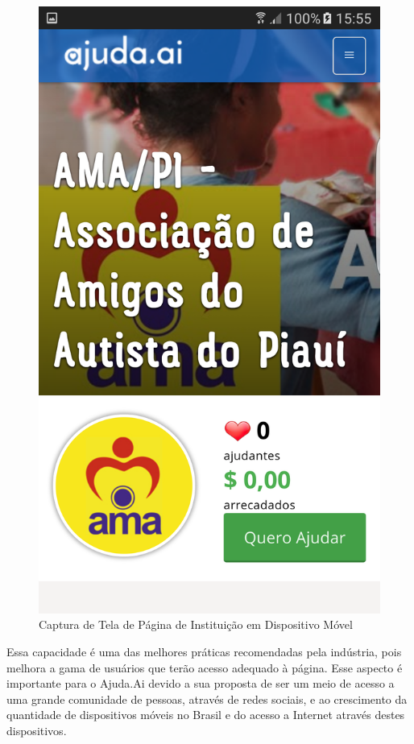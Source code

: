 \begin{figure}[H]
\begin{minipage}{0.4\textwidth}
    \centering
    \caption{Captura de Tela de Página de Instituição em Dispositivo Móvel}
    \label{fig:ss_ajudaai_06}
    \includegraphics[scale=0.12]{imagens/screenshot-ajudaai-06.png}
  \end{minipage}
\end{figure}

Essa capacidade é uma das melhores práticas recomendadas pela indústria, pois melhora a gama de usuários que terão acesso adequado à página. Esse aspecto é importante para o Ajuda.Ai devido a sua proposta de ser um meio de acesso a uma grande comunidade de pessoas, através de redes sociais, e ao crescimento da quantidade de dispositivos móveis no Brasil e do acesso a Internet através destes dispositivos.

